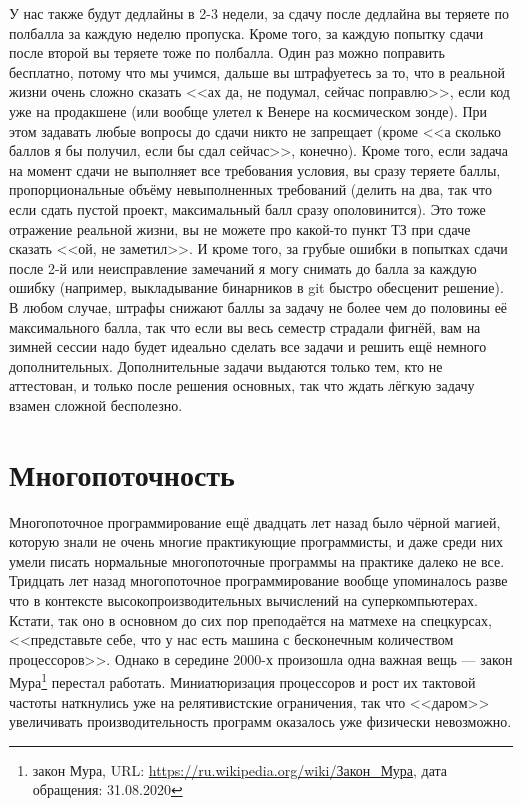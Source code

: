 \documentclass{../../text-style}
\begin{document}
У нас также будут дедлайны в 2-3 недели, за сдачу после дедлайна вы теряете по полбалла за каждую неделю пропуска. Кроме того, за каждую попытку сдачи после второй вы теряете тоже по полбалла. Один раз можно поправить бесплатно, потому что мы учимся, дальше вы штрафуетесь за то, что в реальной жизни очень сложно сказать <<ах да, не подумал, сейчас поправлю>>, если код уже на продакшене (или вообще улетел к Венере на космическом зонде). При этом задавать любые вопросы до сдачи никто не запрещает (кроме <<а сколько баллов я бы получил, если бы сдал сейчас>>, конечно). Кроме того, если задача на момент сдачи не выполняет все требования условия, вы сразу теряете баллы, пропорциональные объёму невыполненных требований (делить на два, так что если сдать пустой проект, максимальный балл сразу ополовинится). Это тоже отражение реальной жизни, вы не можете про какой-то пункт ТЗ при сдаче сказать <<ой, не заметил>>. И кроме того, за грубые ошибки в попытках сдачи после 2-й или неисправление замечаний я могу снимать до балла за каждую ошибку (например, выкладывание бинарников в git быстро обесценит решение). В любом случае, штрафы снижают баллы за задачу не более чем до половины её максимального балла, так что если вы весь семестр страдали фигнёй, вам на зимней сессии надо будет идеально сделать все задачи и решить ещё немного дополнительных. Дополнительные задачи выдаются только тем, кто не аттестован, и только после решения основных, так что ждать лёгкую задачу взамен сложной бесполезно.

\section{Многопоточность}

Многопоточное программирование ещё двадцать лет назад было чёрной магией, которую знали не очень многие практикующие программисты, и даже среди них умели писать нормальные многопоточные программы на практике далеко не все. Тридцать лет назад многопоточное программирование вообще упоминалось разве что в контексте высокопроизводительных вычислений на суперкомпьютерах. Кстати, так оно в основном до сих пор преподаётся на матмехе на спецкурсах, <<представьте себе, что у нас есть машина с бесконечным количеством процессоров>>. Однако в середине 2000-х произошла одна важная вещь --- закон Мура\footnote{закон Мура, URL: \url{https://ru.wikipedia.org/wiki/Закон\_Мура}, дата обращения: 31.08.2020} перестал работать. Миниатюризация процессоров и рост их тактовой частоты наткнулись уже на релятивистские ограничения, так что <<даром>> увеличивать производительность программ оказалось уже физически невозможно. 
\end{document}
